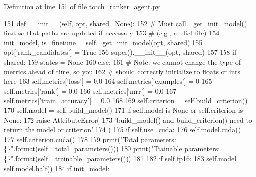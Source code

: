 Definition at line 151 of file torch\+\_\+ranker\+\_\+agent.\+py.


\begin{DoxyCode}
151     \textcolor{keyword}{def }\_\_init\_\_(self, opt, shared=None):
152         \textcolor{comment}{# Must call \_get\_init\_model() first so that paths are updated if necessary}
153         \textcolor{comment}{# (e.g., a .dict file)}
154         init\_model, is\_finetune = self.\_get\_init\_model(opt, shared)
155         opt[\textcolor{stringliteral}{'rank\_candidates'}] = \textcolor{keyword}{True}
156         super().\_\_init\_\_(opt, shared)
157 
158         \textcolor{keywordflow}{if} shared:
159             states = \textcolor{keywordtype}{None}
160         \textcolor{keywordflow}{else}:
161             \textcolor{comment}{# Note: we cannot change the type of metrics ahead of time, so you}
162             \textcolor{comment}{# should correctly initialize to floats or ints here}
163             self.metrics[\textcolor{stringliteral}{'loss'}] = 0.0
164             self.metrics[\textcolor{stringliteral}{'examples'}] = 0
165             self.metrics[\textcolor{stringliteral}{'rank'}] = 0.0
166             self.metrics[\textcolor{stringliteral}{'mrr'}] = 0.0
167             self.metrics[\textcolor{stringliteral}{'train\_accuracy'}] = 0.0
168 
169             self.criterion = self.build\_criterion()
170             self.model = self.build\_model()
171             \textcolor{keywordflow}{if} self.model \textcolor{keywordflow}{is} \textcolor{keywordtype}{None} \textcolor{keywordflow}{or} self.criterion \textcolor{keywordflow}{is} \textcolor{keywordtype}{None}:
172                 \textcolor{keywordflow}{raise} AttributeError(
173                     \textcolor{stringliteral}{'build\_model() and build\_criterion() need to return the model or criterion'}
174                 )
175             \textcolor{keywordflow}{if} self.use\_cuda:
176                 self.model.cuda()
177                 self.criterion.cuda()
178 
179             print(\textcolor{stringliteral}{"Total parameters: \{\}"}.\hyperlink{namespaceparlai_1_1chat__service_1_1services_1_1messenger_1_1shared__utils_a32e2e2022b824fbaf80c747160b52a76}{format}(self.\_total\_parameters()))
180             print(\textcolor{stringliteral}{"Trainable parameters:  \{\}"}.\hyperlink{namespaceparlai_1_1chat__service_1_1services_1_1messenger_1_1shared__utils_a32e2e2022b824fbaf80c747160b52a76}{format}(self.\_trainable\_parameters()))
181 
182             \textcolor{keywordflow}{if} self.fp16:
183                 self.model = self.model.half()
184             \textcolor{keywordflow}{if} init\_model:

\end{DoxyCode}
